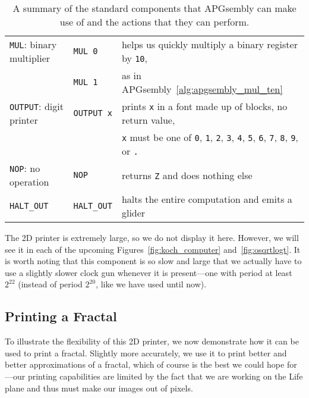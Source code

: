 \begin{table}[!htb]
\begin{center}
\begin{tabular}{lll}
			\texttt{MUL}: binary multiplier & \texttt{MUL 0} & helps us quickly multiply a binary register by \texttt{10}, \\
			& \texttt{MUL 1} & as in APGsembly~\ref{alg:apgsembly_mul_ten} \\\midrule
			\texttt{OUTPUT}: digit printer & \texttt{OUTPUT x} & prints \texttt{x} in a font made up of blocks, no return value,\\
			& & \texttt{x} must be one of \texttt{0}, \texttt{1}, \texttt{2}, \texttt{3}, \texttt{4}, \texttt{5}, \texttt{6}, \texttt{7}, \texttt{8}, \texttt{9}, or \texttt{.}\\\midrule
			
			\texttt{NOP}: no operation & \texttt{NOP} & returns \texttt{Z} and does nothing else\\\midrule
			
			\texttt{HALT\_OUT} & \texttt{HALT\_OUT} & halts the entire computation and emits a glider\\
			\bottomrule
		\end{tabular}
	\end{center}
	\caption{A summary of the standard components that APGsembly can make use of and the actions that they can perform.}\label{tab:universal_computation_components}
\end{table}

The 2D printer is extremely large, so we do not display it here. However, we will see it in each of the upcoming Figures~\ref{fig:koch_computer} and~\ref{fig:osqrtlogt}. It is worth noting that this component is so slow and large that we actually have to use a slightly slower clock gun whenever it is present---one with period at least $2^{22}$ (instead of period $2^{20}$, like we have used until now). 



\subsection{Printing a Fractal}\label{sec:koch_snowflake}

To illustrate the flexibility of this 2D printer, we now demonstrate how it can be used to print a fractal. Slightly more accurately, we use it to print better and better approximations of a fractal, which of course is the best we could hope for---our printing capabilities are limited by the fact that we are working on the Life plane and thus must make our images out of pixels.

